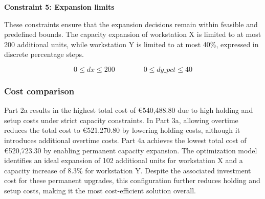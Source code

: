 \documentclass[a4paper,faculty=eb,language=en,doctype=article,sftitles=false]{ugent-doc}
\begin{document}
\textbf{Constraint 5: Expansion limits}

These constraints ensure that the expansion decisions remain within feasible and predefined bounds. The capacity expansion of workstation X is limited to at most 200 additional units, while workstation Y is limited to at most 40\%, expressed in discrete percentage steps.

\[
0 \leq dx \leq 200 \qquad\qquad 0 \leq dy\_pct \leq 40
\]

\subsubsection{Cost comparison}

Part 2a results in the highest total cost of €540{,}488.80 due to high holding and setup costs under strict capacity constraints. In Part 3a, allowing overtime reduces the total cost to €521{,}270.80 by lowering holding costs, although it introduces additional overtime costs. Part 4a achieves the lowest total cost of €520{,}723.30 by enabling permanent capacity expansion. The optimization model identifies an ideal expansion of 102 additional units for workstation X and a capacity increase of 8.3\% for workstation Y. Despite the associated investment cost for these permanent upgrades, this configuration further reduces holding and setup costs, making it the most cost-efficient solution overall.
\end{document}
